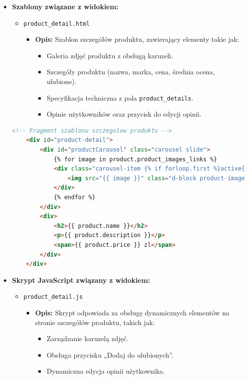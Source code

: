 \documentclass[12pt,a4paper,oneside]{article}
\theoremstyle{definition}
\numberwithin{equation}{section}
\begin{document}
\begin{itemize}
    \item \textbf{Szablony związane z widokiem:}
        \begin{itemize}
            \item \texttt{product\_detail.html}
                \begin{itemize}
                    \item \textbf{Opis:} Szablon szczegółów produktu, zawierający elementy takie jak:
                    \begin{itemize}
                        \item Galeria zdjęć produktu z obsługą karuzeli.
                        \item Szczegóły produktu (nazwa, marka, cena, średnia ocena, ulubione).
                        \item Specyfikacja techniczna z pola \texttt{product\_details}.
                        \item Opinie użytkowników oraz przycisk do edycji opinii.
                    \end{itemize}
                \end{itemize}
        \end{itemize}
        \begin{lstlisting}[language=HTML, caption=Szablon product\_detail.html]
    <!-- Fragment szablonu szczegolow produktu -->
    <div id="product-detail">
        <div id="productCarousel" class="carousel slide">
            {% for image in product.product_images_links %}
            <div class="carousel-item {% if forloop.first %}active{% endif %}">
                <img src="{{ image }}" class="d-block product-image">
            </div>
            {% endfor %}
        </div>
        <div>
            <h2>{{ product.name }}</h2>
            <p>{{ product.description }}</p>
            <span>{{ product.price }} zl</span>
        </div>
    </div>
        \end{lstlisting}


    \item \textbf{Skrypt JavaScript związany z widokiem:}
        \begin{itemize}
            \item \texttt{product\_detail.js}
            \begin{itemize}
                \item \textbf{Opis:} Skrypt odpowiada za obsługę dynamicznych elementów na stronie szczegółów produktu, takich jak:
                \begin{itemize}
                    \item Zarządzanie karuzelą zdjęć.
                    \item Obsługa przycisku „Dodaj do ulubionych”.
                    \item Dynamiczna edycja opinii użytkownika.
                \end{itemize}
            \end{itemize}
        \end{itemize}


\end{itemize}
\end{document}
